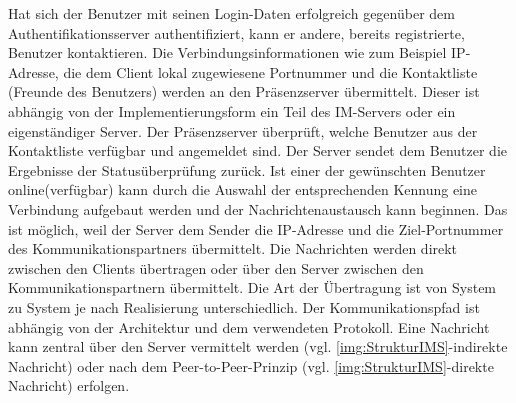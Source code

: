 \documentclass[a4paper,titlepage,halfparskip,12pt]{scrreprt}
\begin{document}
\begin{onehalfspacing}
Hat sich der Benutzer mit seinen Login-Daten erfolgreich gegenüber dem Authentifikationsserver authentifiziert, kann er andere, bereits registrierte, Benutzer kontaktieren. Die Verbindungsinformationen wie zum Beispiel IP-Adresse, die dem Client lokal zugewiesene Portnummer und die Kontaktliste (Freunde des Benutzers) werden an den Präsenzserver übermittelt. Dieser ist abhängig von der Implementierungsform ein Teil des IM-Servers oder ein eigenständiger Server. Der Präsenzserver überprüft, welche Benutzer aus der Kontaktliste verfügbar und angemeldet sind. Der Server sendet dem Benutzer die Ergebnisse der Statusüberprüfung zurück. Ist einer der gewünschten Benutzer \glqq online\grqq (verfügbar) kann durch die Auswahl der entsprechenden Kennung eine Verbindung aufgebaut werden und der Nachrichtenaustausch kann beginnen. Das ist möglich, weil der Server dem Sender die IP-Adresse und die Ziel-Portnummer des Kommunikationspartners übermittelt. Die Nachrichten werden direkt zwischen den Clients übertragen oder über den Server zwischen den Kommunikationspartnern übermittelt. Die Art der Übertragung ist von System zu System je nach Realisierung unterschiedlich. Der Kommunikationspfad ist abhängig von der Architektur und dem verwendeten Protokoll. Eine Nachricht kann zentral über den Server vermittelt werden (vgl. \autoref{img:StrukturIMS}-indirekte Nachricht) oder nach dem Peer-to-Peer-Prinzip (vgl. \autoref{img:StrukturIMS}-direkte Nachricht) erfolgen. 


\end{onehalfspacing}
\end{document}
